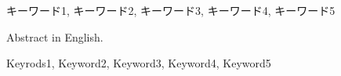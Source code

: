 \begin{jabstract}
\begin{jkeyword}
キーワード1, キーワード2, キーワード3, キーワード4, キーワード5
\end{jkeyword}
\end{jabstract}

\begin{eabstract} Abstract in English.
\begin{ekeyword}
Keyrods1, Keyword2, Keyword3, Keyword4, Keyword5
\end{ekeyword}
\end{eabstract}
